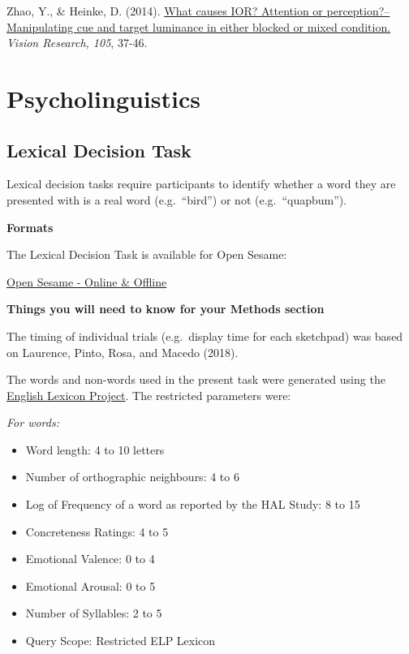\documentclass[
]{book}
\providecommand{\tightlist}{%
  \setlength{\itemsep}{0pt}\setlength{\parskip}{0pt}}
\begin{document}
Zhao, Y., \& Heinke, D. (2014). \href{https://core.ac.uk/download/pdf/185482615.pdf}{What causes IOR? Attention or perception?--Manipulating cue and target luminance in either blocked or mixed condition.} \emph{Vision Research, 105}, 37-46.

\hypertarget{psycholinguistics}{%
\chapter{Psycholinguistics}\label{psycholinguistics}}

\hypertarget{lexical-decision-task}{%
\section{Lexical Decision Task}\label{lexical-decision-task}}

Lexical decision tasks require participants to identify whether a word they are presented with is a real word (e.g.~``bird'') or not (e.g.~``quapbum'').

\textbf{Formats}

The Lexical Decision Task is available for Open Sesame:

\href{GitHub/LexicalDecisionTask.osexp}{Open Sesame - Online \& Offline}

\textbf{Things you will need to know for your Methods section}

The timing of individual trials (e.g.~display time for each sketchpad) was based on Laurence, Pinto, Rosa, and Macedo (2018).

The words and non-words used in the present task were generated using the \href{https://elexicon.wustl.edu/}{English Lexicon Project}. The restricted parameters were:

\emph{For words:}

\begin{itemize}
\tightlist
\item
  Word length: 4 to 10 letters
\item
  Number of orthographic neighbours: 4 to 6
\item
  Log of Frequency of a word as reported by the HAL Study: 8 to 15
\item
  Concreteness Ratings: 4 to 5
\item
  Emotional Valence: 0 to 4
\item
  Emotional Arousal: 0 to 5
\item
  Number of Syllables: 2 to 5
\item
  Query Scope: Restricted ELP Lexicon
\end{itemize}
\end{document}
